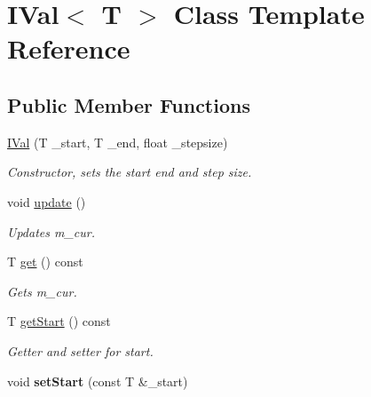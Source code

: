 \hypertarget{class_i_val}{}\section{I\+Val$<$ T $>$ Class Template Reference}
\label{class_i_val}
\subsection*{Public Member Functions}
\begin{DoxyCompactItemize}
\item 
\hypertarget{class_i_val_a6f31fac4e5c9138c447d9999e78f7cb2}{}\hyperlink{class_i_val_a6f31fac4e5c9138c447d9999e78f7cb2}{I\+Val} (T \+\_\+start, T \+\_\+end, float \+\_\+stepsize)\label{class_i_val_a6f31fac4e5c9138c447d9999e78f7cb2}

\begin{DoxyCompactList}\small\item\em Constructor, sets the start end and step size. \end{DoxyCompactList}\item 
\hypertarget{class_i_val_a3b8be7d7d36341872d4bfa1e5ad89f90}{}void \hyperlink{class_i_val_a3b8be7d7d36341872d4bfa1e5ad89f90}{update} ()\label{class_i_val_a3b8be7d7d36341872d4bfa1e5ad89f90}

\begin{DoxyCompactList}\small\item\em Updates m\+\_\+cur. \end{DoxyCompactList}\item 
\hypertarget{class_i_val_aa95d5bfc6f40c78965d75ebd5bbc1263}{}T \hyperlink{class_i_val_aa95d5bfc6f40c78965d75ebd5bbc1263}{get} () const \label{class_i_val_aa95d5bfc6f40c78965d75ebd5bbc1263}

\begin{DoxyCompactList}\small\item\em Gets m\+\_\+cur. \end{DoxyCompactList}\item 
\hypertarget{class_i_val_aae9c5d88d42398c442f83bb188ceb6e2}{}T \hyperlink{class_i_val_aae9c5d88d42398c442f83bb188ceb6e2}{get\+Start} () const \label{class_i_val_aae9c5d88d42398c442f83bb188ceb6e2}

\begin{DoxyCompactList}\small\item\em Getter and setter for start. \end{DoxyCompactList}\item 
\hypertarget{class_i_val_adcdf026ee8c1edd079c179454aa9c196}{}void {\bfseries set\+Start} (const T \&\+\_\+start)\label{class_i_val_adcdf026ee8c1edd079c179454aa9c196}


\end{DoxyCompactItemize}
